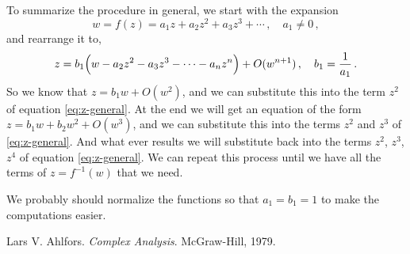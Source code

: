 \documentclass[12pt]{article}
\begin{document}
To summarize the procedure in general,
we start with the expansion
\begin{equation}
\label{eq:f}
w = f(z) = a_1 z + a_2 z^2 + a_3 z^3 + \dotsb \,, \quad a_1 \neq 0\,,
\end{equation}
and rearrange it to,
\begin{equation}
\label{eq:z-general}
z = b_1 \Bigl( w - a_2 z^2 - a_3 z^3 - \dotsb - a_n z^n \Bigr) + O(w^{n+1})\,, \quad b_1 = \frac{1}{a_1}\,.
\end{equation}
So we know that $z = b_1 w + O(w^2)$,
and we can substitute
this into the term $z^2$ of equation \eqref{eq:z-general}.
At the end we will get an equation of the form
$z = b_1 w + b_2 w^2 + O(w^3)$, and we can substitute this
into the terms $z^2$ and $z^3$ of \eqref{eq:z-general}.
And what ever results we will substitute back into the 
terms $z^2$, $z^3$, $z^4$ of equation \eqref{eq:z-general}.
We can repeat this process until 
we have all the terms of $z = f^{-1}(w)$ that we need.

We probably should normalize
the functions so that $a_1 = b_1 = 1$
to make the computations easier.

\begin{thebibliography}{XXXXX}

Lars V. Ahlfors. {\it Complex Analysis}. McGraw-Hill, 1979.

\end{thebibliography}
\end{document}
